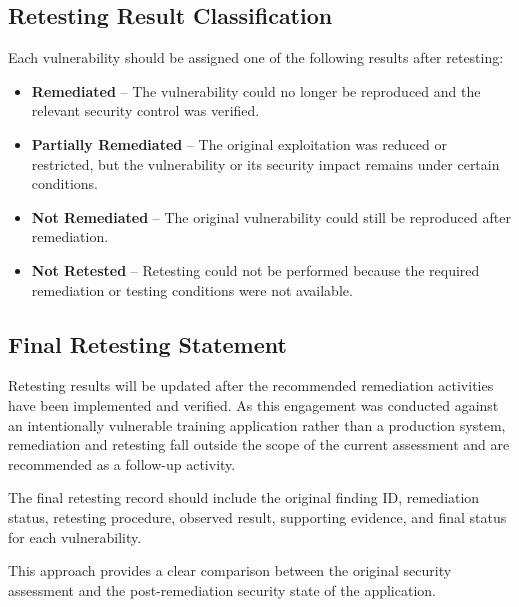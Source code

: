 \subsection*{Retesting Result Classification}

Each vulnerability should be assigned one of the following results
after retesting:

\begin{itemize}

    \item \textbf{Remediated} -- The vulnerability could no longer be
    reproduced and the relevant security control was verified.

    \item \textbf{Partially Remediated} -- The original exploitation
    was reduced or restricted, but the vulnerability or its security
    impact remains under certain conditions.

    \item \textbf{Not Remediated} -- The original vulnerability could
    still be reproduced after remediation.

    \item \textbf{Not Retested} -- Retesting could not be performed
    because the required remediation or testing conditions were not
    available.

\end{itemize}

\subsection*{Final Retesting Statement}

Retesting results will be updated after the recommended remediation
activities have been implemented and verified. As this engagement
was conducted against an intentionally vulnerable training
application rather than a production system, remediation and
retesting fall outside the scope of the current assessment and are
recommended as a follow-up activity.

The final retesting record should include the original finding ID,
remediation status, retesting procedure, observed result, supporting
evidence, and final status for each vulnerability.

This approach provides a clear comparison between the original
security assessment and the post-remediation security state of the
application.